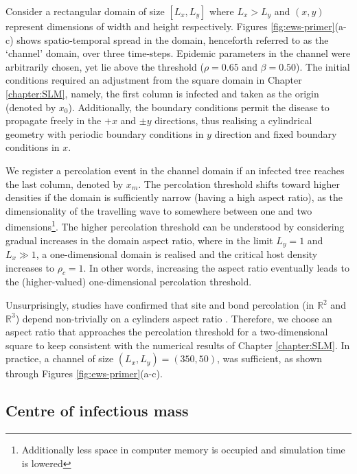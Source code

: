 Consider a rectangular domain of size $[L_x, L_y]$ where $L_x>L_y$ and $(x, y)$ represent dimensions of width and height respectively.
Figures \ref{fig:ews-primer}(a-c) shows spatio-temporal spread in the domain, henceforth referred to as the `channel' domain, over three time-steps.
Epidemic parameters in the channel were arbitrarily chosen, yet lie above the threshold ($\rho=0.65$ and $\beta=0.50$).
The initial conditions required an adjustment from the square domain in Chapter \ref{chapter:SLM}, namely, the first column is infected and taken as the origin (denoted by $x_0$).
Additionally, the boundary conditions permit the disease to propagate freely in the $+x$ and $\pm y$ directions, thus realising a cylindrical geometry with periodic boundary conditions in $y$ direction and fixed boundary conditions in $x$.

We register a percolation event in the channel domain if an infected tree reaches the last column, denoted by $x_m$.
The percolation threshold shifts toward higher densities if the domain is sufficiently narrow (having a high aspect ratio), as the dimensionality of the travelling wave to somewhere between one and two dimensions\footnote{Additionally less space in computer memory is occupied and simulation time is lowered}. 
The higher percolation threshold can be understood by considering gradual increases in the domain aspect ratio, 
where in the limit $L_y = 1$ and $L_x \gg 1$, a one-dimensional domain is realised and the critical host density increases to $\rho_c=1$.
In other words, increasing the aspect ratio eventually leads to the (higher-valued) one-dimensional percolation threshold.

Unsurprisingly, studies have confirmed that site and bond percolation (in $\mathbb{R}^2$ and  $\mathbb{R}^3$) depend non-trivially on a cylinders aspect ratio \cite{sangare2009continuum}.
Therefore, we choose an aspect ratio that approaches the percolation threshold for a two-dimensional square to keep consistent with the numerical results of Chapter \ref{chapter:SLM}. 
In practice, a channel of size $(L_x, L_y) = (350, 50)$, was sufficient, as shown through Figures \ref{fig:ews-primer}(a-c). 


\subsection{Centre of infectious mass}

